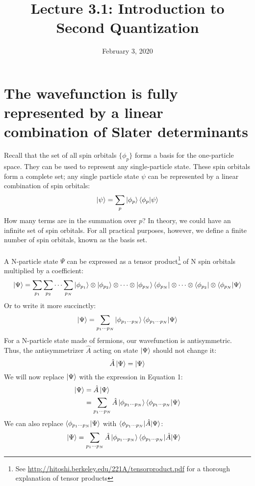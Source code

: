 \documentclass{article}
\title{Lecture 3.1: Introduction to Second Quantization}
\date{February 3, 2020}
\begin{document}
\maketitle
\noindent
\section{The wavefunction is fully represented by a linear combination of Slater determinants}
Recall that the set of all spin orbitals $\{\phi_p\}$ forms a basis for the one-particle space.
They can be used to represent any single-particle state.
These spin orbitals form a complete set; any single particle state $\psi$ can be represented by
a linear combination of spin orbitals:
\[\ket{\psi} = \sum_p \ket{\phi_p}\braket{\phi_p | \psi} \]
How many terms are in the summation over $p$? 
In theory, we could have an infinite set of spin orbitals.
For all practical purposes, however, we define a finite number of spin orbitals, known as the basis set. \\
\\
A N-particle state $\Psi$ can be expressed as a tensor product\footnote{See \url{http://hitoshi.berkeley.edu/221A/tensorproduct.pdf} for a thorough explanation of tensor products} of N spin orbitals multiplied by a coefficient:
\[\ket{\Psi} = \sum_{p_1}\sum_{p_2}\cdots\sum_{p_N} \ket{\phi_{p_1}}\otimes \ket{\phi_{p_2}} \otimes \cdots \otimes \ket{\phi_{p_N}}  \bra{\phi_{p_N}}\otimes \cdots \otimes \bra{\phi_{p_2}} \otimes \braket{\phi_{p_N}  | \Psi} \]
Or to write it more succinctly: 
\begin{equation}
\ket{\Psi} = \sum_{p_1 \cdots p_N} \ket{\phi_{p_1 \cdots p_N}} \braket{\phi_{p_1 \cdots p_N} | \Psi} 
\end{equation}
For a N-particle state made of fermions, our wavefunction is antisymmetric.
Thus, the antisymmetrizer $\hat{A}$ acting on state $\ket{\Psi}$ should not change it: 
\[ \hat{A}\ket{\Psi} = \ket{\Psi} \]
We will now replace $\ket{\Psi}$ with the expression in Equation 1: 
\begin{align*}
\ket{\Psi} &=  \hat{A} \ket{\Psi}\\
&=\sum_{p_1 \cdots p_N}\hat{A} \ket{\phi_{p_1 \cdots p_N}} \braket{\phi_{p_1 \cdots p_N} | \Psi}  
\end{align*}
We can also replace $\braket{\phi_{p_1 \cdots p_N} | \Psi}$ with $\braket{\phi_{p_1 \cdots p_N} | \hat{A} | \Psi} $: 
\begin{align*}
\ket{\Psi} &=\sum_{p_1 \cdots p_N}\hat{A} \ket{\phi_{p_1 \cdots p_N}} \braket{\phi_{p_1 \cdots p_N} | \hat{A} | \Psi} 
\end{align*}
\end{document}
